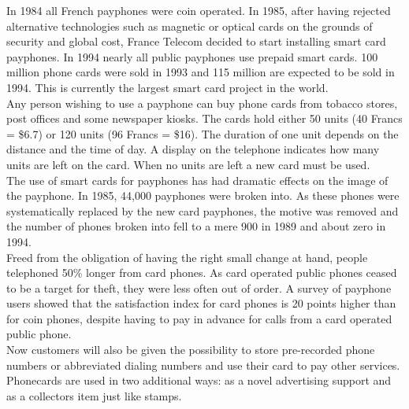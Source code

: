 \begin{htmllist}
    
    In 1984 all French payphones were coin operated. In 1985, after having
    rejected alternative technologies such as magnetic or optical cards on
    the grounds of security and global cost, France Telecom decided to
    start installing smart card payphones. In 1994 nearly all public
    payphones use prepaid smart cards. 100 million phone cards were sold in
    1993 and 115 million are expected to be sold in 1994. This is currently
    the largest smart card project in the world.\\
    
    Any person wishing to use a payphone can buy phone cards from tobacco
    stores, post offices and some newspaper kiosks. The cards hold either
    50 units (40 Francs = \$6.7) or 120 units (96 Francs = \$16). The
    duration of one unit depends on the distance and the time of day. A
    display on the telephone indicates how many units are left on the card.
    When no units are left a new card must be used.\\
    
    The use of smart cards for payphones has had dramatic effects on the
    image of the payphone. In 1985, 44,000 payphones were broken into. As
    these phones were systematically replaced by the new card payphones,
    the motive was removed and the number of phones broken into fell to a
    mere 900 in 1989 and about zero in 1994.\\
    
    Freed from the obligation of having the right small change at hand,
    people telephoned 50\% longer from card phones. As card operated public
    phones ceased to be a target for theft, they were less often out of
    order. A survey of payphone users showed that the satisfaction index
    for card phones is 20 points higher than for coin phones, despite
    having to pay in advance for calls from a card operated public phone.\\
    
    Now customers will also be given the possibility to store pre-recorded
    phone numbers or abbreviated dialing numbers and use their card to pay
    other services.\\
    
    Phonecards are used in two additional ways: as a novel advertising
    support and as a collectors item just like stamps.\\
    

\end{htmllist}
